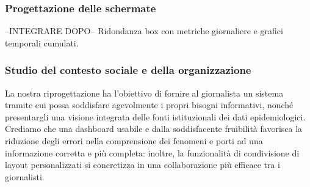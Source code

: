 \subsubsection{Progettazione delle schermate}
--INTEGRARE DOPO--
Ridondanza box con metriche giornaliere e grafici temporali cumulati.

\subsubsection{Studio del contesto sociale e della organizzazione}
La nostra riprogettazione ha l'obiettivo di fornire al giornalista un sistema tramite cui possa soddisfare agevolmente i propri bisogni informativi, nonché presentargli una visione integrata delle fonti istituzionali dei dati epidemiologici. Crediamo che una dashboard usabile e dalla soddisfacente fruibilità favorisca la riduzione degli errori nella comprensione dei fenomeni e porti ad una informazione corretta e più completa: inoltre, la funzionalità di condivisione di layout personalizzati si concretizza in una collaborazione più efficace tra i giornalisti.
